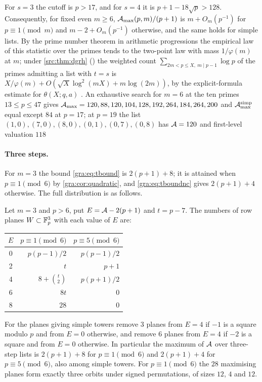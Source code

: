 For $s=3$ the cutoff is $p>17$, and for $s=4$ it is $p+1-18\sqrt p>128$.
Consequently, for fixed even $m\ge6$, $\mathcal{A}_{\max}(p,m)/(p+1)$ is
$m+O_m(p^{-1})$ for $p\equiv1\pmod m$ and $m-2+O_m(p^{-1})$ otherwise, and
the same holds for simple lists. By the prime number theorem in arithmetic
progressions the empirical law of this statistic over the primes tends to
the two-point law with mass $1/\varphi(m)$ at $m$; under \cref{src:thm:dgrh}
(\stG) the weighted count $\sum_{2m<p\le X,\ m\mid p-1}\log p$ of the primes
admitting a list with $t=s$ is $X/\varphi(m)+O(\sqrt X\log^2(mX)+m\log(2m))$,
by the explicit-formula estimate for $\theta(X;q,a)$ \cite{Lee2023Prime}. An
exhaustive search for $m=6$ at the ten primes $13\le p\le47$ gives
$\mathcal{A}_{\max}=120,88,120,104,128,192,264,184,264,200$ and
$\mathcal{A}^{\mathrm{simp}}_{\max}$ equal except $84$ at $p=17$; at $p=19$ the list
$(1,0),(7,0),(8,0),(0,1),(0,7),(0,8)$ has $\mathcal{A}=120$ and first-level
valuation $118$

\paragraph{Three steps.}
For $m=3$ the bound \eqref{gra:eq:tbound} is $2(p+1)+8$; it is attained
when $p\equiv1\pmod6$ by \cref{gra:cor:quadratic}, and \eqref{gra:eq:tboundnc}
gives $2(p+1)+4$ otherwise. The full distribution is as follows.

\begin{theorem}\label{gra:thm:three}
Let $m=3$ and $p>6$, put $E=\mathcal{A}-2(p+1)$ and $t=p-7$. The numbers of row
planes $W\subset\mathbb{F}_p^3$ with each value of $E$ are:
\begin{center}\small\upshape
\begin{tabular}{crr}
\toprule
$E$ & $p\equiv1\pmod6$ & $p\equiv5\pmod6$\\
\midrule
0 & $p(p-1)/2$ & $p(p-1)/2$\\
2 & $t$ & $p+1$\\
4 & $8+\binom t2$ & $p(p+1)/2$\\
6 & $8t$ & $0$\\
8 & $28$ & $0$\\
\bottomrule
\end{tabular}
\end{center}
For the planes giving simple towers remove $3$ planes from $E=4$ if $-1$
is a square modulo $p$ and from $E=0$ otherwise, and remove $6$ planes
from $E=4$ if $-2$ is a square and from $E=0$ otherwise. In particular the
maximum of $\mathcal{A}$ over three-step lists is $2(p+1)+8$ for
$p\equiv1\pmod6$ and $2(p+1)+4$ for $p\equiv5\pmod6$, also among simple
towers. For $p\equiv1\pmod6$ the $28$ maximising planes form exactly three
orbits under signed permutations, of sizes $12$, $4$ and $12$.
\end{theorem}

